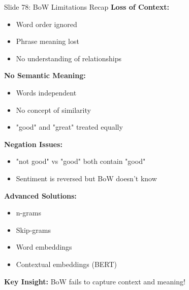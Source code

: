 \documentclass[8pt]{beamer}
\begin{document}
	\begin{frame}{Slide 78: BoW Limitations Recap}
		\fontsize{6.5}{7.5}\selectfont
		\textbf{Loss of Context:}
		\begin{itemize}
			\item Word order ignored
			\item Phrase meaning lost
			\item No understanding of relationships
		\end{itemize}
		
		\vspace{0.1cm}
		\textbf{No Semantic Meaning:}
		\begin{itemize}
			\item Words independent
			\item No concept of similarity
			\item "good" and "great" treated equally
		\end{itemize}
		
		\vspace{0.1cm}
		\textbf{Negation Issues:}
		\begin{itemize}
			\item "not good" vs "good" both contain "good"
			\item Sentiment is reversed but BoW doesn't know
		\end{itemize}
		
		\vspace{0.1cm}
		\textbf{Advanced Solutions:}
		\begin{itemize}
			\item n-grams
			\item Skip-grams
			\item Word embeddings
			\item Contextual embeddings (BERT)
		\end{itemize}
		
		\textcolor{myblue}{\textbf{Key Insight:}} BoW fails to capture context and meaning!
	\end{frame}
	
\end{document}
